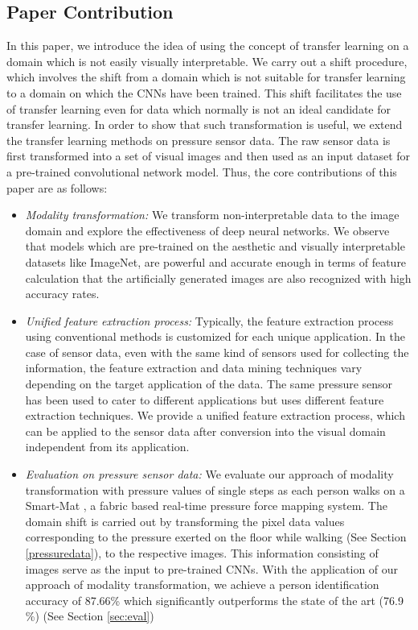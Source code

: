 \subsection{Paper Contribution}
  In this paper, we introduce the idea of using the concept of transfer learning on a domain which is not easily visually interpretable. We carry out a shift procedure, which involves the shift from a domain which is not suitable for transfer learning to a domain on which the CNNs have been trained. This shift facilitates the use of transfer learning even for data which normally is not an ideal candidate for transfer learning. In order to show that such transformation is useful,  we extend the transfer learning methods on pressure sensor data. The raw sensor data is first transformed into a set of visual images and then used as an input dataset for a pre-trained convolutional network model. Thus, the core contributions of this paper are as follows:
\begin{itemize}
\item \textit{Modality transformation:} We transform non-interpretable data to the image domain and explore the effectiveness of deep neural networks. We observe that models which are pre-trained on the aesthetic and visually interpretable datasets like ImageNet, are powerful and accurate enough in terms of feature calculation that the artificially generated images are also recognized with high accuracy rates.

\item \textit{Unified feature extraction process:} Typically, the feature extraction process using conventional methods is customized for each unique application. In the case of sensor data, even with the same kind of sensors used for collecting the information, the feature extraction and data mining techniques vary depending on the target application of the data. The same pressure sensor has been used to cater to different applications \cite{cheng2016smart, SmartMat} but uses different feature extraction techniques. We provide a unified feature extraction process, which can be applied to the sensor data after conversion into the visual domain independent from its application.

\item \textit{Evaluation on pressure sensor data:} We evaluate our approach of modality transformation with pressure values of single steps as each person walks on a Smart-Mat \cite{SmartMat}, a fabric based real-time pressure force mapping system. The domain shift is carried out by transforming the pixel data values corresponding to the pressure exerted on the floor while walking (See Section \ref{pressuredata}), to the respective images. This information consisting of images serve as the input to pre-trained CNNs. With the application of our approach of modality transformation, we achieve a person identification accuracy of 87.66\% which significantly outperforms the state of the art (76.9 \%) (See Section \ref{sec:eval})

\end{itemize}


